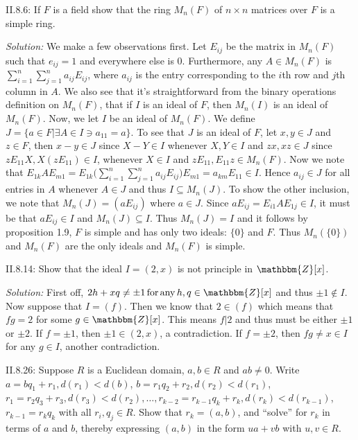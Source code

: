 \documentclass{letter}
\newcommand{\nin}{\not\in}
\newcommand{\tmem}[1]{{\em #1\/}}
\newcommand{\tmop}[1]{\ensuremath{\operatorname{#1}}}
\begin{document}
II.8.6: If $F$ is a field show that the ring $M_n (F)$ of $n \times n$
matrices over $F$ is a simple ring.

{\tmem{Solution:}} We make a few observations first. Let $E_{i j}$ be the
matrix in $M_n (F)$ such that $e_{i j} = 1$ and everywhere else is 0.
Furthermore, any $A \in M_n (F)$ is $\sum^n_{i = 1} \sum^n_{j = 1} a_{i j}
E_{i j}$, where $a_{i j}$ is the entry corresponding to the $i$th row and
$j$th column in $A$. We also see that it's straightforward from the binary
operations definition on $M_n (F)$, that if $I$ is an ideal of $F$, then $M_n
(I)$ is an ideal of $M_n (F)$. Now, we let $I$ be an ideal of $M_n (F)$. We
define $J =\{a \in F | \exists A \in I \ni a_{1 1} = a\}$. To see that $J$ is
an ideal of $F$, let $x, y \in J$ and $z \in F$, then $x - y \in J$ since $X -
Y \in I$ whenever $X, Y \in I$ and $z x, x z \in J$ since $z E_{1 1} X, X (z
E_{1 1}) \in I$, whenever $X \in I$ and $z E_{11}, E_{11} z \in M_n (F)$. Now
we note that $E_{1 k} A E_{m 1} = E_{1 k} ( \text{$\sum^n_{i = 1} \sum^n_{j =
1} a_{i j} E_{i j})$} E_{m 1} = a_{k m} E_{1 1} \in I$. Hence $a_{i j} \in J$
for all entries in $A$ whenever $A \in J$ and thus $I \subseteq M_n (J)$. To
show the other inclusion, we note that $M_n (J) = (a E_{i j})$ where $a \in
J$. Since $a E_{i j} = E_{i 1} A E_{1 j} \in I$, it must be that $a E_{i j}
\in I$ and $M_n (J) \subseteq I$. Thus $M_n (J) = I$ and it follows by
proposition 1.9, $F$ is simple and has only two ideals: $\{0\}$ and $F$. Thus
$M_n (\{0\})$ and $M_n (F)$ are the only ideals and $M_n (F)$ is simple.

II.8.14: Show that the ideal $I = (2, x)$ is not principle in
$\mathbbm{Z}[x]$.

{\tmem{Solution:}} First off, $2 h + x q \neq \pm 1 \tmop{for} \tmop{any} h,
q \in \mathbbm{Z}[x]$ and thus $\pm 1 \nin I$. Now suppose that $I = (f)$.
Then we know that $2 \in (f)$ which means that $f g = 2$ for some $g \in
\mathbbm{Z}[x]$. This means $f | 2$ and thus must be either $\pm 1$ or $\pm
2$. If $f = \pm 1$, then $\pm 1 \in (2, x)$, a contradiction. If $f = \pm 2$,
then $f g \neq x \in I$ for any $g \in I$, another contradiction.

II.8.26: Suppose $R$ is a Euclidean domain, $a, b \in R$ and $a b \neq 0$.
Write $a = b q_1 + r_1, d (r_1) < d (b)$, $b = r_1 q_2 + r_2, d (r_2) < d
(r_1)$, $r_1 = r_2 q_3 + r_3, d (r_3) < d (r_2), \ldots, r_{k - 2} = r_{k - 1}
q_k + r_k, d (r_k) < d (r_{k - 1})$, $r_{k - 1} = r_k q_k$ with all $r_i, q_j
\in R$. Show that $r_k = (a, b)$, and ``solve'' for $r_k$ in terms of $a$ and
$b$, thereby expressing $(a, b)$ in the form $u a + v b$ with $u, v \in R$.
\end{document}
